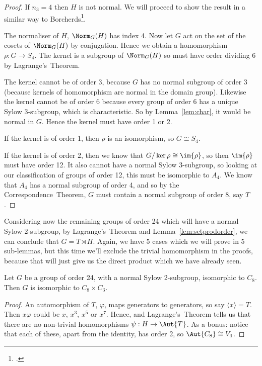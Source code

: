 \begin{proof}
    If \(n_3 = 4\) then \(H\) is not normal.
    We will proceed to show the result in a similar way to Borcherds\footcite{order24}.

    The normaliser of \(H\), \(\Norm_G(H)\) has index 4.
    Now let \(G\) act on the set of the cosets of \(\Norm_G(H)\) by conjugation.
    Hence we obtain a homomorphism \(\rho:G \to S_4\).
    The kernel is a subgroup of \(\Norm_G(H)\) so must have order dividing 6 by Lagrange's~Theorem.

    The kernel cannot be of order 3, because \(G\) has no normal subgroup of order 3 (because kernels of homomorphism are
    normal in the domain group).
    Likewise the kernel cannot be of order 6 because every group of order 6 has a unique Sylow 3-subgroup, which is
    characteristic.
    So by Lemma~\ref{lem:char}, it would be normal in \(G\).
    Hence the kernel must have order 1 or 2.

    If the kernel is of order 1, then \(\rho\) is an isomorphism, so \(G \cong S_4\).

    If the kernel is of order 2, then we know that \(G/\ker{\rho} \cong \im{\rho}\), so then \(\im{\rho}\) must have order
    12.
    It also cannot have a normal Sylow 3-subgroup, so looking at our classification of groups of order 12, this must be
    isomorphic to \(A_4\).
    We know that \(A_4\) has a normal subgroup of order 4, and so by the Correspondence~Theorem, \(G\) must contain a normal
    subgroup of order 8, say \(T\).
\end{proof}

Considering now the remaining groups of order 24 which will have a normal Sylow 2-subgroup, by Lagrange's~Theorem and
Lemma~\ref{lem:setprodorder}, we can conclude that \(G = T \rtimes H\).
Again, we have 5 cases which we will prove in 5 sub-lemmas, but this time we'll exclude the trivial homomorphism in
the proofs, because that will just give us the direct
product which we have already seen.

\begin{lemma}
    Let \(G\) be a group of order 24, with a normal Sylow 2-subgroup, isomorphic to \(C_8\).
    Then \(G\) is isomorphic to \(C_8 \times C_3\).
\end{lemma}

\begin{proof}
    An automorphism of \(T\), \(\varphi\), maps generators to generators, so say \(\langle x \rangle = T\).
    Then \(x\varphi\) could be \(x\), \(x^3\), \(x^5\) or \(x^7\).
    Hence, and Lagrange's~Theorem tells us that there are no non-trivial homomorphisms \(\psi:H \to \Aut{T}\).
    As a bonus: notice that each of these, apart from the identity, has order 2, so \(\Aut{C_8} \cong V_4\).
\end{proof}

